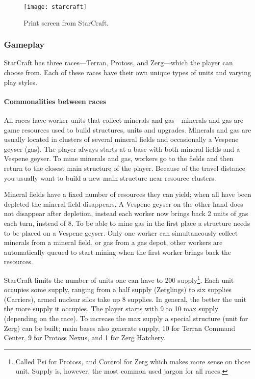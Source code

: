 \begin{figure}[htb]
\centering
\texttt{[image: starcraft]}
\caption{Print screen from StarCraft.}
\label{fig:starcraft}
\end{figure}

\subsubsection{Gameplay}
StarCraft has three races—Terran, Protoss, and Zerg—which the player can choose from. Each of these races have their own unique types of units and varying play styles.

\paragraph{Commonalities between races}
All races have worker units that collect minerals and gas—minerals and gas are game resources used to build structures, units and upgrades. Minerals and gas are usually located in clusters of several mineral fields and occasionally a Vespene geyser (gas). The player always starts at a base with both mineral fields and a Vespene geyser. To mine minerals and gas, workers go to the fields and then return to the closest main structure of the player. Because of the travel distance you usually want to build a new main structure near resource clusters.

Mineral fields have a fixed number of resources they can yield; when all have been depleted the mineral field disappears. A Vespene geyser on the other hand does not disappear after depletion, instead each worker now brings back 2 units of gas each turn, instead of 8. To be able to mine gas in the first place a structure needs to be placed on a Vespene geyser. Only one worker can simultaneously collect minerals from a mineral field, or gas from a gas depot, other workers are automatically queued to start mining when the first worker brings back the resources.

\label{sec:starcraft_supply}
StarCraft limits the number of units one can have to 200 supply\footnote{Called Psi for Protoss, and Control for Zerg which makes more sense on those unit. Supply is, however, the most common used jargon for all races.}. Each unit occupies some supply, ranging from a half supply (Zerglings) to six supplies (Carriers), armed nuclear silos take up 8 supplies. In general, the better the unit the more supply it occupies. The player starts with 9 to 10 max supply (depending on the race). To increase the max supply a special structure (unit for Zerg) can be built; main bases also generate supply, 10 for Terran Command Center, 9 for Protoss Nexus, and 1 for Zerg Hatchery.

